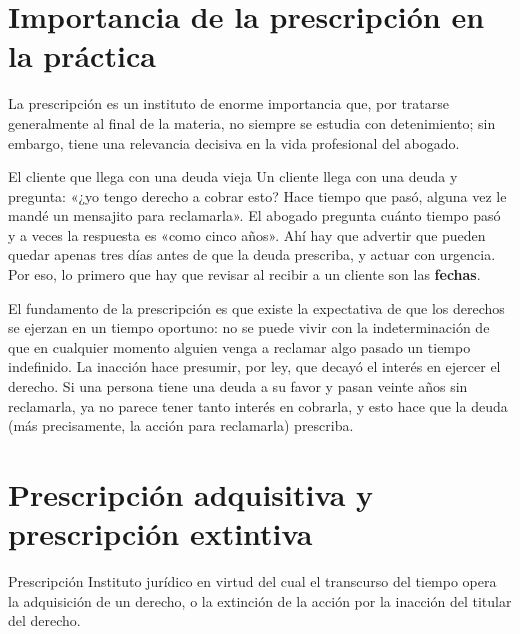 \documentclass[12pt,oneside]{book}
\begin{document}
\section{Importancia de la prescripción en la práctica}

La prescripción es un instituto de enorme importancia que, por tratarse generalmente al final de la materia, no siempre se estudia con detenimiento; sin embargo, tiene una relevancia decisiva en la vida profesional del abogado.

\begin{example}{El cliente que llega con una deuda vieja}
Un cliente llega con una deuda y pregunta: «¿yo tengo derecho a cobrar esto? Hace tiempo que pasó, alguna vez le mandé un mensajito para reclamarla». El abogado pregunta cuánto tiempo pasó y a veces la respuesta es «como cinco años». Ahí hay que advertir que pueden quedar apenas tres días antes de que la deuda prescriba, y actuar con urgencia. Por eso, lo primero que hay que revisar al recibir a un cliente son las \textbf{fechas}.
\end{example}

El fundamento de la prescripción es que existe la expectativa de que los derechos se ejerzan en un tiempo oportuno: no se puede vivir con la indeterminación de que en cualquier momento alguien venga a reclamar algo pasado un tiempo indefinido. La inacción hace presumir, por ley, que decayó el interés en ejercer el derecho. Si una persona tiene una deuda a su favor y pasan veinte años sin reclamarla, ya no parece tener tanto interés en cobrarla, y esto hace que la deuda (más precisamente, la acción para reclamarla) prescriba.

\section{Prescripción adquisitiva y prescripción extintiva}

\begin{definition}{Prescripción}
Instituto jurídico en virtud del cual el transcurso del tiempo opera la adquisición de un derecho, o la extinción de la acción por la inacción del titular del derecho.
\end{definition}
\end{document}
